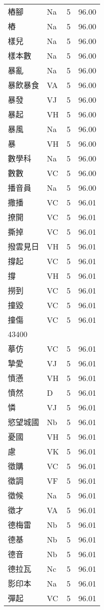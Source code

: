 \documentclass[twocolumn]{book}
\begin{document}
\begin{supertabular}{llrr}
樁腳 & Na & 5 &  96.00\\
樁 & Na & 5 &  96.00\\
樣兒 & Na & 5 &  96.00\\
樣本數 & Na & 5 &  96.00\\
暴亂 & Na & 5 &  96.00\\
暴飲暴食 & VA & 5 &  96.00\\
暴發 & VJ & 5 &  96.00\\
暴起 & VH & 5 &  96.00\\
暴風 & Na & 5 &  96.00\\
暴 & VH & 5 &  96.00\\
數學科 & Na & 5 &  96.00\\
數數 & VC & 5 &  96.00\\
播音員 & Na & 5 &  96.00\\
撒播 & VC & 5 &  96.01\\
撩開 & VC & 5 &  96.01\\
撕掉 & VC & 5 &  96.01\\
撥雲見日 & VH & 5 &  96.01\\
撐起 & VC & 5 &  96.01\\
撐 & VH & 5 &  96.01\\
撈到 & VC & 5 &  96.01\\
撞毀 & VC & 5 &  96.01\\
撞傷 & VC & 5 &  96.01\\
43400\\
摹仿 & VC & 5 &  96.01\\
摯愛 & VJ & 5 &  96.01\\
憤懣 & VH & 5 &  96.01\\
憤然 & D & 5 &  96.01\\
憐 & VJ & 5 &  96.01\\
慾望城國 & Nb & 5 &  96.01\\
憂國 & VH & 5 &  96.01\\
慮 & VK & 5 &  96.01\\
徵購 & VC & 5 &  96.01\\
徵調 & VF & 5 &  96.01\\
徵候 & Na & 5 &  96.01\\
徵才 & VA & 5 &  96.01\\
德梅雷 & Nb & 5 &  96.01\\
德基 & Nb & 5 &  96.01\\
德音 & Nb & 5 &  96.01\\
德拉瓦 & Nc & 5 &  96.01\\
影印本 & Na & 5 &  96.01\\
彈起 & VC & 5 &  96.01\\

\end{supertabular}
\end{document}
